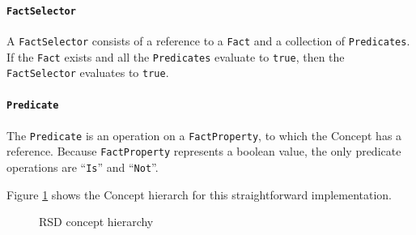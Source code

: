 \paragraph{\texttt{FactSelector}} A \texttt{FactSelector} consists of a reference to a \texttt{Fact} and a collection of \texttt{Predicates}.
If the \texttt{Fact} exists and all the \texttt{Predicates} evaluate to \texttt{true}, then the \texttt{FactSelector} evaluates to \texttt{true}.

\paragraph{\texttt{Predicate}} The \texttt{Predicate} is an operation on a \texttt{FactProperty}, to which the Concept has a reference.
Because \texttt{FactProperty} represents a boolean value, the only predicate operations are ``\texttt{Is}'' and ``\texttt{Not}''.

Figure \ref{fig:RSDDiagram} shows the Concept hierarch for this straightforward implementation.

\begin{figure}
    \centering
    \caption{RSD concept hierarchy}
    \label{fig:RSDDiagram}
\end{figure}

